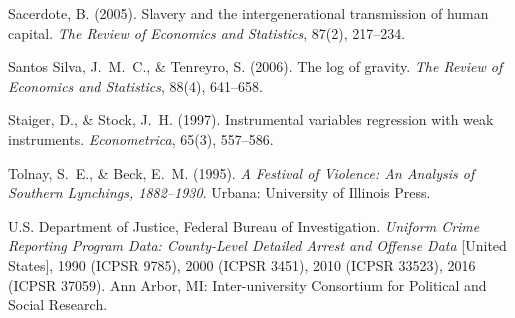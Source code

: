 \documentclass[12pt]{article}
\begin{document}
\begin{thebibliography}{}
Sacerdote, B. (2005).
Slavery and the intergenerational transmission of human capital.
\textit{The Review of Economics and Statistics}, 87(2), 217--234.

Santos Silva, J.~M.~C., \& Tenreyro, S. (2006).
The log of gravity.
\textit{The Review of Economics and Statistics}, 88(4), 641--658.

Staiger, D., \& Stock, J.~H. (1997).
Instrumental variables regression with weak instruments.
\textit{Econometrica}, 65(3), 557--586.

Tolnay, S.~E., \& Beck, E.~M. (1995).
\textit{A Festival of Violence: An Analysis of Southern Lynchings, 1882--1930}.
Urbana: University of Illinois Press.

U.S. Department of Justice, Federal Bureau of Investigation.
\textit{Uniform Crime Reporting Program Data: County-Level Detailed Arrest and Offense Data} [United States], 1990 (ICPSR 9785), 2000 (ICPSR 3451), 2010 (ICPSR 33523), 2016 (ICPSR 37059).
Ann Arbor, MI: Inter-university Consortium for Political and Social Research.

\end{thebibliography}
\end{document}
